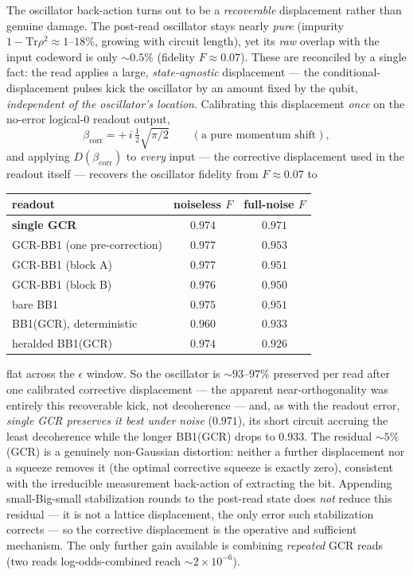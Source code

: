 \documentclass[11pt]{article}
\begin{document}
The oscillator back-action turns out to be a \emph{recoverable} displacement rather than genuine
damage. The post-read oscillator stays nearly \emph{pure} (impurity $1-\mathrm{Tr}\rho^2\approx1$--$18\%$,
growing with circuit length), yet its \emph{raw} overlap with the input codeword is only $\sim\!0.5\%$ (fidelity
$F\approx0.07$). These are reconciled by a single fact: the read applies a large, \emph{state-agnostic}
displacement --- the conditional-displacement pulses kick the oscillator by an amount fixed by the
qubit, \emph{independent of the oscillator's location}. Calibrating this displacement \emph{once} on the
no-error logical-$0$ readout output,
\begin{equation}
\beta_{\mathrm{corr}}=+\,i\,\tfrac{1}{2}\sqrt{\pi/2}\qquad(\text{a pure momentum shift}),
\end{equation}
and applying $D(\beta_{\mathrm{corr}})$ to \emph{every} input --- the corrective displacement used in the
readout itself --- recovers the oscillator fidelity from $F\approx0.07$ to
\begin{center}
\begin{tabular}{lcc}
\toprule
readout & noiseless $F$ & full-noise $F$\\
\midrule
\textbf{single GCR} & $0.974$ & $\mathbf{0.971}$\\
GCR-BB1 (one pre-correction) & $0.977$ & $0.953$\\
GCR-BB1 (block A) & $0.977$ & $0.951$\\
GCR-BB1 (block B) & $0.976$ & $0.950$\\
bare BB1 & $0.975$ & $0.951$\\
BB1(GCR), deterministic & $0.960$ & $0.933$\\
heralded BB1(GCR) & $0.974$ & $0.926$\\
\bottomrule
\end{tabular}
\end{center}
flat across the $\epsilon$ window. So the oscillator is $\sim\!93$--$97\%$ preserved per read after one
calibrated corrective displacement --- the apparent near-orthogonality was entirely this recoverable
kick, not decoherence --- and, as with the readout error, \emph{single GCR preserves it best under
noise} ($0.971$), its short circuit accruing the least decoherence while the longer BB1(GCR) drops to
$0.933$. The residual $\sim\!5\%$ (GCR) is a genuinely non-Gaussian distortion: neither a further
displacement nor a squeeze removes it (the optimal corrective squeeze is exactly zero), consistent with
the irreducible measurement back-action of extracting the bit. Appending small-Big-small stabilization
rounds to the post-read state does \emph{not} reduce this residual --- it is not a lattice displacement,
the only error such stabilization corrects --- so the corrective displacement is the operative and
sufficient mechanism. The only further gain available is combining \emph{repeated} GCR reads (two reads
log-odds-combined reach $\sim\!2\times10^{-6}$).
\end{document}
